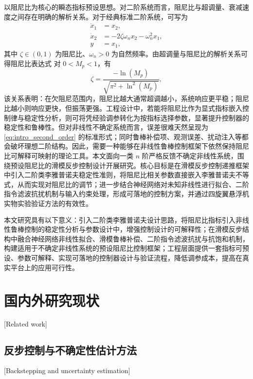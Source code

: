 以阻尼比为核心的瞬态指标预设思想。对二阶系统而言，阻尼比与超调量、衰减速度之间存在明确的解析关系。对于经典标准二阶系统，可写为
\begin{subequations}\label{eq:intro_second_order}
\begin{align}
\dot{x}_1 &= x_2,\label{eq:intro_second_order_a}\\
\dot{x}_2 &= -2\zeta\omega_n x_2-\omega_n^2 x_1,\label{eq:intro_second_order_b}\\
y &= x_1,\label{eq:intro_second_order_c}
\end{align}
\end{subequations}
其中 $\zeta \in (0,1)$ 为阻尼比、$\omega_n>0$ 为自然频率。由超调量与阻尼比的解析关系可得阻尼比表达式
对 $0<M_p<1$，有
\begin{equation}\label{eq:intro_mp}
  \zeta = \frac{-\ln(M_p)}{\sqrt{\pi^2+\ln^2(M_p)}},
\end{equation}
该关系表明：在欠阻尼范围内，阻尼比越大通常超调越小，系统响应更平稳；阻尼比越小则响应更快，但振荡更强。工程设计中，若能将阻尼比作为显式指标嵌入控制律与稳定性分析，则可将凭经验调参转化为按指标选择参数，显著提升控制器的稳定性和鲁棒性\cite{ref38}。但对非线性不确定系统而言，误差很难天然呈现为 \eqref{eq:intro_second_order} 的标准形式；同时鲁棒补偿项、观测误差、扰动注入等都会破坏理想二阶结构。因此，需要一种能够在非线性鲁棒控制框架下依然保持阻尼比可解释可映射的理论工具\cite{ref57,ref64,ref65,ref66}。本文面向一类 $n$ 阶严格反馈不确定非线性系统，围绕预设阻尼比的滑模反步控制设计开展研究。核心目标是在滑模反步控制递推框架中引入二阶类李雅普诺夫稳定性准则，将阻尼比相关参数直接嵌入李雅普诺夫不等式，从而实现对阻尼比的调节；进一步结合神经网络对未知非线性进行拟合、二阶指令滤波抗扰机制与输入约束处理，形成可落地的控制方案，并通过四旋翼悬浮机实物实验验证方法的有效性。

本文研究具有以下意义：引入二阶类李雅普诺夫设计思路，将阻尼比指标引入非线性鲁棒控制的稳定性分析与参数设计中，增强控制设计的可解释性；在滑模反步结构中融合神经网络非线性拟合、滑模鲁棒补偿、二阶指令滤波抗扰与抗饱和机制，构建适用于不确定非线性系统的预设阻尼比控制框架；工程层面提供一套指标可预设、参数可解释、实现可落地的控制器设计与验证流程，降低调参成本，提高在真实平台上的应用可行性。

\section{国内外研究现状}[Related work]

\subsection{反步控制与不确定性估计方法}[Backstepping and uncertainty estimation]

